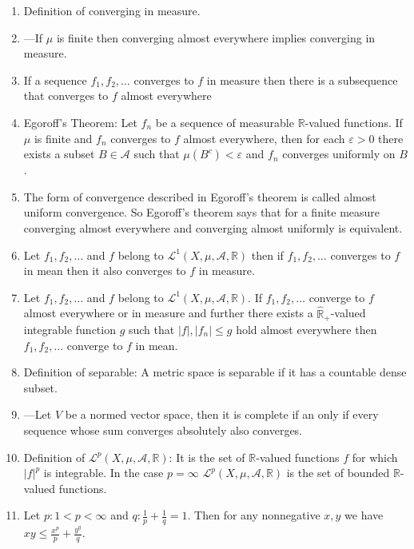 \documentclass{article}
\begin{document}
\begin{enumerate}
    \section{Del III}
    \item Definition of converging in measure.
    \item ---If $\mu$ is finite then converging almost everywhere implies converging in measure.
    \item If a sequence $f_1,f_2,\ldots$ converges to $f$ in measure then there is a subsequence that converges to $f$ almost everywhere
    \item Egoroff's Theorem: Let $f_n$ be a sequence of measurable $\mathbb{R}$-valued functions. If $\mu$ is finite and $f_n$ converges to $f$ almost everywhere, then for each $\varepsilon>0$ there exists a subset $B\in \mathscr{A}$ such that $\mu(B^c)<\varepsilon$ and $f_n$ converges uniformly on $B$.
    \item The form of convergence described in Egoroff's theorem is called almost uniform convergence. So Egoroff's theorem says that for a finite measure converging almost everywhere and converging almost uniformly is equivalent.
    \item Let $f_1,f_2,\dots$ and $f$ belong to $\mathscr{L^1}(X,\mu,\mathscr{A},\mathbb{R})$ then if $f_1,f_2,\dots$ converges to $f$ in mean then it also converges to $f$ in measure.
    \item Let $f_1,f_2,\dots$ and $f$ belong to $\mathscr{L^1}(X,\mu,\mathscr{A},\mathbb{R})$. If $f_1,f_2,\dots$ converge to $f$ almost everywhere or in measure and further there exists a $\hat{\mathbb{R}}_+$-valued integrable function $g$ such that $|f|,|f_n|\leq g$ hold almost everywhere then $f_1,f_2,\dots$ converge to $f$ in mean.
    \item Definition of separable: A metric space is separable if it has a countable dense subset.
    \item ---Let $V$ be a normed vector space, then it is complete if an only if every sequence whose sum converges absolutely also converges.
    \item Definition of $\mathscr{L}^p(X,\mu,\mathscr{A},\mathbb{R})$: It is the set of $\mathbb{R}$-valued functions $f$ for which $|f|^p$ is integrable. In the case $p=\infty$ $\mathscr{L}^p(X,\mu,\mathscr{A},\mathbb{R})$ is the set of bounded $\mathbb{R}$-valued functions.
    \item Let $p: 1<p<\infty$ and $q: \frac{1}{p}+\frac{1}{q}=1$. Then for any nonnegative $x,y$ we have $xy\leq \frac{x^p}{p}+\frac{y^q}{q}$.

\end{enumerate}
\end{document}
